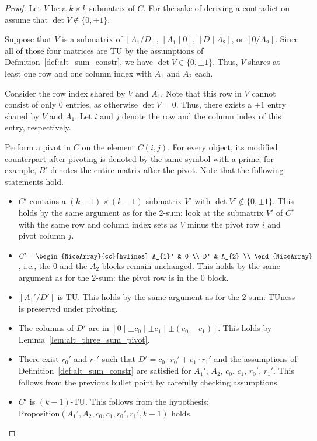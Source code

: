 \documentclass{article}
\theoremstyle{definition}
\begin{document}
\begin{proof}
    Let $V$ be a $k \times k$ submatrix of $C$. For the sake of deriving a contradiction assume that $\det V \notin \{0, \pm 1\}$.

    Suppose that $V$ is a submatrix of $[A_{1} / D]$, $[A_{1} \mid 0]$, $[D \mid A_{2}]$, or $[0 / A_{2}]$. Since all of those four matrices are TU by the assumptions of Definition~\ref{def:alt_sum_constr}, we have $\det V \in \{0, \pm 1\}$. Thus, $V$ shares at least one row and one column index with $A_{1}$ and $A_{2}$ each.

    Consider the row index shared by $V$ and $A_{1}$. Note that this row in $V$ cannot consist of only $0$ entries, as otherwise $\det V = 0$. Thus, there exists a $\pm 1$ entry shared by $V$ and $A_{1}$. Let $i$ and $j$ denote the row and the column index of this entry, respectively.

    Perform a pivot in $C$ on the element $C (i, j)$. For every object, its modified counterpart after pivoting is denoted by the same symbol with a prime; for example, $B'$ denotes the entire matrix after the pivot. Note that the following statements hold.

    \begin{itemize}
        \item $C'$ contains a $(k - 1) \times (k - 1)$ submatrix $V'$ with $\det V' \notin \{0, \pm 1\}$. This holds by the same argument as for the $2$-sum: look at the submatrix $V'$ of $C'$ with the same row and column index sets as $V$ minus the pivot row $i$ and pivot column $j$.
        \item $C' = \begin{NiceArray}{cc}[hvlines] A_{1}' & 0 \\ D' & A_{2} \\ \end{NiceArray}$, i.e., the $0$ and the $A_{2}$ blocks remain unchanged. This holds by the same argument as for the $2$-sum: the pivot row is in the $0$ block.
        \item $[A_{1}' / D']$ is TU. This holds by the same argument as for the $2$-sum: TUness is preserved under pivoting.
        \item The columns of $D'$ are in $[0 \mid \pm c_{0} \mid \pm c_{1} \mid \pm (c_{0} - c_{1})]$. This holds by Lemma~\ref{lem:alt_three_sum_pivot}.
        \item There exist $r_{0}'$ and $r_{1}'$ such that $D' = c_{0} \cdot r_{0}' + c_{1} \cdot r_{1}'$ and the assumptions of Definition~\ref{def:alt_sum_constr} are satisfied for $A_{1}'$, $A_{2}$, $c_{0}$, $c_{1}$, $r_{0}'$, $r_{1}'$. This follows from the previous bullet point by carefully checking assumptions.
        \item $C'$ is $(k - 1)$-TU. This follows from the hypothesis: $\mathrm{Proposition}(A_{1}', A_{2}, c_{0}, c_{1}, r_{0}', r_{1}', k - 1)$ holds.
    \end{itemize}


\end{proof}
\end{document}
